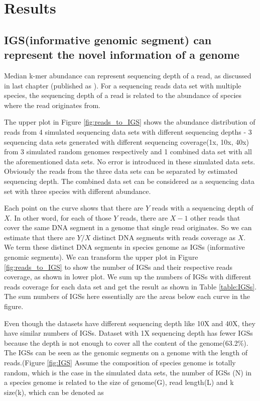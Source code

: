 \documentclass{article}
\begin{document}
\section{Results}



\subsection{IGS(informative genomic segment) can represent the novel 
information of a genome}

Median k-mer abundance can represent sequencing depth of a read, as discussed
in last chapter (published as \cite{Brown2012}).
 For a sequencing reads data set with multiple species, the sequencing depth of
 a read is related to the abundance of species where the read originates from. 

The upper plot in Figure \ref{fig:reads_to_IGS} shows the abundance distribution of reads 
from 4 simulated sequencing data sets with different sequencing depths - 3 
sequencing data sets generated with different sequencing coverage(1x, 10x, 40x)
 from 3 simulated random genomes respectively and 1 combined data set with all 
the aforementioned data sets. No error is introduced in these simulated 
data sets. Obviously the reads from the three data sets can be separated by 
estimated sequencing depth. The combined data set can be considered as a 
sequencing data set with three species with different abundance.

Each point on the curve shows that there are $Y$ reads with a sequencing depth of
 $X$. In other word, for each of those $Y$ reads, there are $X-1$ other reads that 
cover the same DNA segment in a genome that single read originates. So we can 
estimate that there are $Y/X$ distinct DNA segments with reads coverage as $X$. 
We term these distinct DNA segments in species genome as 
IGSs (informative genomic segments). We can transform the upper plot in 
Figure \ref{fig:reads_to_IGS} to show the number of IGSs and their respective 
reads coverage, as 
shown in lower plot. We sum up the numbers of IGSs with 
different reads coverage for each data set and get the result as shown in 
Table \ref{table:IGSs}. The sum numbers of IGSs here essentially are the areas below each curve 
in the figure.

Even though the datasets have different sequencing depth like 10X and 40X, 
they have similar numbers of IGSs. Dataset with 1X sequencing depth has fewer 
IGSs because the depth is not enough to cover all the content of the 
genome(63.2\%). The IGSs can be seen as the
genomic segments on a genome with the length of reads.(Figure \ref{fig:IGS} 
Assume the composition of species 
genome is totally random, which is the case in the simulated data sets, the 
number of IGSs (N) in a species genome is related to the size of genome(G), 
read length(L) and k size(k), which can be denoted as
\end{document}
